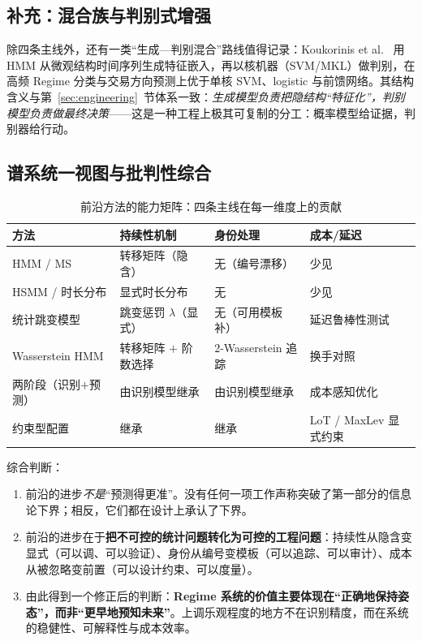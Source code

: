 \subsection{补充：混合族与判别式增强}

除四条主线外，还有一类“生成—判别混合”路线值得记录：Koukorinis et al.~\cite{koukorinis2025} 用 HMM 从微观结构时间序列生成特征嵌入，再以核机器（SVM/MKL）做判别，在高频 Regime 分类与交易方向预测上优于单核 SVM、logistic 与前馈网络。其结构含义与第~\ref{sec:engineering}~节体系一致：\emph{生成模型负责把隐结构“特征化”，判别模型负责做最终决策}——这是一种工程上极其可复制的分工：概率模型给证据，判别器给行动。

\subsection{谱系统一视图与批判性综合}

\begin{table}[htbp]
\centering
\footnotesize
\begin{tabular}{p{3.4cm}p{3.0cm}p{3.0cm}p{2.6cm}}
\toprule
\textbf{方法} & \textbf{持续性机制} & \textbf{身份处理} & \textbf{成本/延迟} \\
\midrule
HMM / MS & 转移矩阵（隐含） & 无（编号漂移） & 少见 \\
HSMM / 时长分布 & 显式时长分布 & 无 & 少见 \\
统计跳变模型 & 跳变惩罚 $\lambda$（显式） & 无（可用模板补） & 延迟鲁棒性测试 \\
Wasserstein HMM & 转移矩阵 $+$ 阶数选择 & $2$-Wasserstein 追踪 & 换手对照 \\
两阶段（识别$+$预测） & 由识别模型继承 & 由识别模型继承 & 成本感知优化 \\
约束型配置 & 继承 & 继承 & LoT / MaxLev 显式约束 \\
\bottomrule
\end{tabular}
\caption{前沿方法的能力矩阵：四条主线在每一维度上的贡献}
\label{tab:frontier-matrix}
\end{table}

综合判断：

\begin{enumerate}[itemsep=3pt]
\item 前沿的进步\emph{不是}“预测得更准”。没有任何一项工作声称突破了第一部分的信息论下界；相反，它们都在设计上承认了下界。
\item 前沿的进步在于\textbf{把不可控的统计问题转化为可控的工程问题}：持续性从隐含变显式（可以调、可以验证）、身份从编号变模板（可以追踪、可以审计）、成本从被忽略变前置（可以设计约束、可以度量）。
\item 由此得到一个修正后的判断：\textbf{Regime 系统的价值主要体现在“正确地保持姿态”，而非“更早地预知未来”}。上调乐观程度的地方不在识别精度，而在系统的稳健性、可解释性与成本效率。
\end{enumerate}


